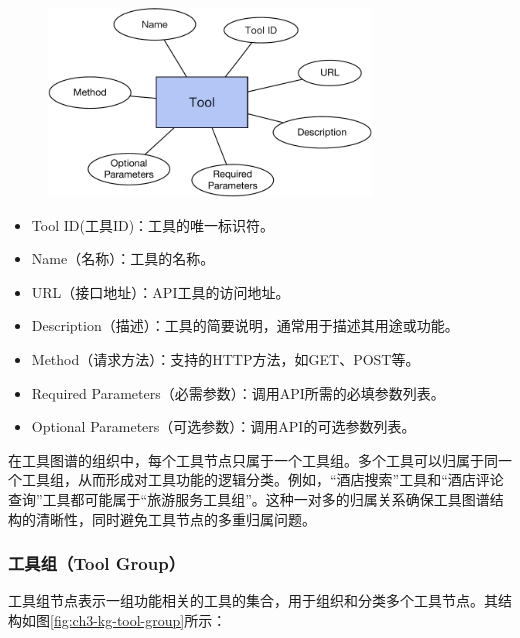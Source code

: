 \begin{figure}[H]
    \vspace{1em}
    \centering
    \setlength{\abovecaptionskip}{10pt} %
    \includegraphics[height=5cm]{../assets/图谱格式-tool.pdf}
    \label{fig:ch3-kg-tool}
\end{figure}

\begin{itemize}
    \item Tool ID(工具ID)：工具的唯一标识符。
    \item Name（名称）：工具的名称。
    \item URL（接口地址）：API工具的访问地址。
    \item Description（描述）：工具的简要说明，通常用于描述其用途或功能。
    \item Method（请求方法）：支持的HTTP方法，如GET、POST等。
    \item Required Parameters（必需参数）：调用API所需的必填参数列表。
    \item Optional Parameters（可选参数）：调用API的可选参数列表。
\end{itemize}

在工具图谱的组织中，每个工具节点只属于一个工具组。多个工具可以归属于同一个工具组，从而形成对工具功能的逻辑分类。例如，“酒店搜索”工具和“酒店评论查询”工具都可能属于“旅游服务工具组”。这种一对多的归属关系确保工具图谱结构的清晰性，同时避免工具节点的多重归属问题。

\subsubsection{工具组（Tool Group）}

工具组节点表示一组功能相关的工具的集合，用于组织和分类多个工具节点。其结构如图\ref{fig:ch3-kg-tool-group}所示：

